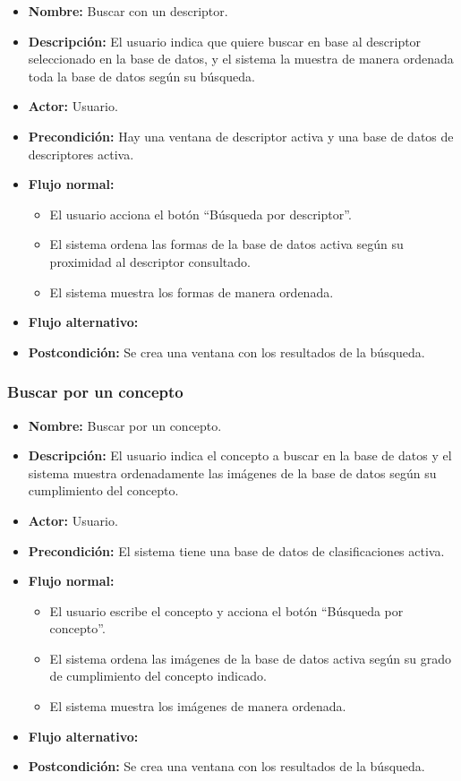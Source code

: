 \begin{itemize}
\item \textbf{Nombre: }Buscar con un descriptor.
\item \textbf{Descripción: } El usuario indica que quiere buscar en base al descriptor seleccionado en la base de datos, y el sistema la muestra de manera ordenada toda la base de datos según su búsqueda.
\item \textbf{Actor: }Usuario.
\item \textbf{Precondición: }Hay una ventana de descriptor activa y una base de datos de descriptores activa.
\item \textbf{Flujo normal: }
\begin{itemize}
\item El usuario acciona el botón ``Búsqueda por descriptor''.
\item El sistema ordena las formas de la base de datos activa según su proximidad al descriptor consultado.
\item El sistema muestra los formas de manera ordenada.
\end{itemize}
\item \textbf{Flujo alternativo:}
\item \textbf{Postcondición: }Se crea una ventana con los resultados de la búsqueda.
\end{itemize}

\subsubsection{Buscar por un concepto}

\begin{itemize}
\item \textbf{Nombre: }Buscar por un concepto.
\item \textbf{Descripción: }El usuario indica el concepto a buscar en la base de datos y el sistema muestra ordenadamente las imágenes de la base de datos según su cumplimiento del concepto.
\item \textbf{Actor: }Usuario.
\item \textbf{Precondición: }El sistema tiene una base de datos de clasificaciones activa.
\item \textbf{Flujo normal: }
\begin{itemize}
\item El usuario escribe el concepto y acciona el botón ``Búsqueda por concepto''.
\item El sistema ordena las imágenes de la base de datos activa según su grado de cumplimiento del concepto indicado.
\item El sistema muestra los imágenes de manera ordenada.
\end{itemize}
\item \textbf{Flujo alternativo:}
\item \textbf{Postcondición: }Se crea una ventana con los resultados de la búsqueda.
\end{itemize}

